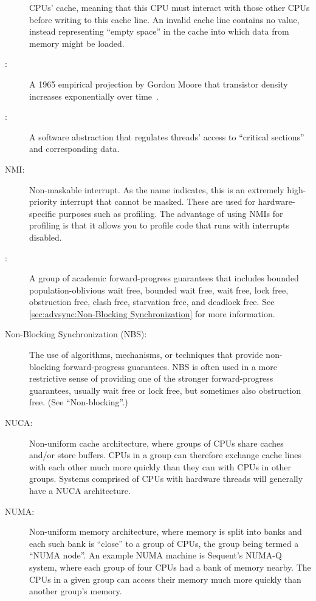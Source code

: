 \begin{description}
	CPUs' cache, meaning that this CPU must interact with those other
	CPUs before writing to this cache line.
	An invalid cache line contains no value, instead representing
	``empty space'' in the cache into which data from memory might
	be loaded.
\item[\IXGaltr{Moore's Law}{Moore's Law}:]
	A 1965 empirical projection by Gordon Moore that
	transistor density increases exponentially over
	time~\cite{GordonMoore1965MooresLaw}.
\item[\IXG{Mutual-Exclusion Mechanism}:]
	A software abstraction that regulates threads' access to
	``critical sections'' and corresponding data.
\item[NMI:]
	Non-maskable interrupt.
	As the name indicates, this is an extremely high-priority
	interrupt that cannot be masked.
	These are used for hardware-specific purposes such as profiling.
	The advantage of using NMIs for profiling is that it allows you
	to profile code that runs with interrupts disabled.
\item[\IXG{Non-Blocking}:]
	A group of academic forward-progress guarantees that includes
	bounded population-oblivious wait free,
	bounded wait free,
	wait free,
	lock free,
	obstruction free,
	clash free,
	starvation free, and
	deadlock free.
	See \cref{sec:advsync:Non-Blocking Synchronization}
	for more information.
\item[Non-Blocking Synchronization (NBS):]
	The use of algorithms, mechanisms, or techniques that provide
	non-blocking forward-progress guarantees.
	NBS is often used in a more restrictive sense of providing one
	of the stronger forward-progress guarantees, usually wait free or
	lock free, but sometimes also obstruction free.
	(See ``Non-blocking''.)
\item[NUCA:]
	Non-uniform cache architecture, where groups of CPUs share
	caches and/or store buffers.
	CPUs in a group can therefore exchange cache lines with each
	other much more quickly than they can with CPUs in other groups.
	Systems comprised of CPUs with hardware threads will generally
	have a NUCA architecture.
\item[NUMA:]
	Non-uniform memory architecture, where memory is split into
	banks and each such bank is ``close'' to a group of CPUs,
	the group being termed a ``NUMA node''.
	An example NUMA machine is Sequent's NUMA-Q system, where
	each group of four CPUs had a bank of memory nearby.
	The CPUs in a given group can access their memory much
	more quickly than another group's memory.

\end{description}
